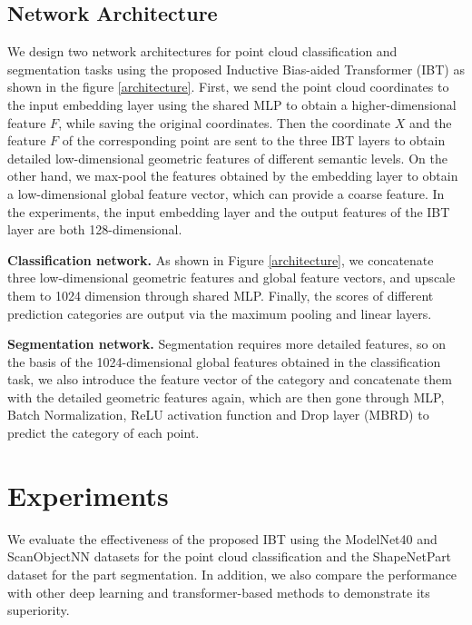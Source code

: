\documentclass[conference]{IEEEtran}
\begin{document}
\subsection{Network Architecture} \vspace{-0.2cm} We design two network architectures for point cloud classification and segmentation tasks using the proposed Inductive Bias-aided Transformer (IBT) as shown in the figure \ref{architecture}. First, we send the point cloud coordinates to the input embedding layer using the shared MLP to obtain a higher-dimensional feature $F$, while saving the original coordinates. Then the coordinate $X$ and the feature $F$ of the corresponding point are sent to the three IBT layers to obtain detailed low-dimensional geometric features of different semantic levels. On the other hand, we max-pool the features obtained by the embedding layer to obtain a low-dimensional global feature vector, which can provide a coarse feature. In the experiments, the input embedding layer and the output features of the IBT layer are both 128-dimensional.

{\bf Classification network.} As shown in Figure \ref{architecture}, we concatenate three low-dimensional geometric features and global feature vectors, and upscale them to 1024 dimension through shared MLP. Finally, the scores of different prediction categories are output via the maximum pooling and linear layers.

{\bf Segmentation network.} Segmentation requires more detailed features, so on the basis of the 1024-dimensional global features obtained in the classification task, we also introduce the feature vector of the category and concatenate them with the detailed geometric features again, which are then gone through MLP, Batch Normalization, ReLU activation function and Drop layer (MBRD) to predict the category of each point.



\vspace{-0.2cm}
\section{Experiments}
\vspace{-0.2cm}
 We evaluate the effectiveness of the proposed IBT  using the ModelNet40 \cite{wu20153d} and ScanObjectNN\cite{uy2019revisiting} datasets for the point cloud classification and the ShapeNetPart \cite{yi2016scalable} dataset for the part segmentation. In addition, we also compare the performance with other deep learning and transformer-based methods to demonstrate its superiority.
\end{document}
